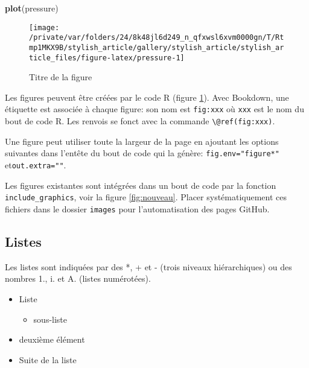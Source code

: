 \documentclass[fleqn,10pt]{latex/stylish_article} %
\providecommand{\tightlist}{%
  \setlength{\itemsep}{0pt}\setlength{\parskip}{0pt}}
\newenvironment{Shaded}{\begin{snugshade}}{\end{snugshade}}
\newcommand{\KeywordTok}[1]{\textcolor[rgb]{0.13,0.29,0.53}{\textbf{{#1}}}}
\newcommand{\NormalTok}[1]{{#1}}
\begin{document}
\scriptsize

\begin{Shaded}
\begin{Highlighting}[]
\KeywordTok{plot}\NormalTok{(pressure)}
\end{Highlighting}
\end{Shaded}

\begin{figure}

{\centering \texttt{[image: /private/var/folders/24/8k48jl6d249\_n\_qfxwsl6xvm0000gn/T/Rtmp1MKX9B/stylish\_article/gallery/stylish\_article/stylish\_article\_files/figure-latex/pressure-1]} 

}

\caption{Titre de la figure}\label{fig:pressure}
\end{figure}

\normalsize

Les figures peuvent être créées par le code R (figure \ref{fig:pressure}).
Avec Bookdown, une étiquette est associée à chaque figure: son nom est \texttt{fig:xxx} où \texttt{xxx} est le nom du bout de code R.
Les renvois se fonct avec la commande \texttt{\textbackslash{}@ref(fig:xxx)}.

Une figure peut utiliser toute la largeur de la page en ajoutant les options suivantes dans l'entête du bout de code qui la génère: \texttt{fig.env="figure*"} et\break \texttt{out.extra=""}.

Les figures existantes sont intégrées dans un bout de code par la fonction \texttt{include\_graphics}, voir la figure \ref{fig:nouveau}.
Placer systématiquement ces fichiers dans le dossier \texttt{images} pour l'automatisation des pages GitHub.

\hypertarget{listes}{%
\subsection{Listes}\label{listes}}

Les listes sont indiquées par des *, + et - (trois niveaux hiérarchiques) ou des nombres 1., i. et A. (listes numérotées).

\begin{itemize}
\tightlist
\item
  Liste

  \begin{itemize}
  \tightlist
  \item
    sous-liste
  \end{itemize}
\item
  deuxième élément
\item
  Suite de la liste
\end{itemize}
\end{document}
